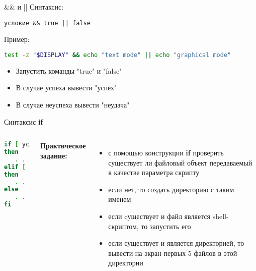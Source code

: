 \begin{frame}[fragile]{\&\& и ||}
	Синтаксис:
\begin{verbatim}
условие && true || false
\end{verbatim}

	\pause
	Пример:
\begin{lstlisting}[language=bash]
test -z "$DISPLAY" && echo "text mode" || echo "graphical mode"
\end{lstlisting}
	
	\pause

	\begin{itemize}
	    \item Запустить команды "true" и "false"
	    \item В случае успеха вывести "успех"
	    \item В случае неуспеха вывести "неудача"
	\end{itemize}
\end{frame}



\begin{frame}[fragile]{Синтаксис {\bf if}}

	\begin{columns}
	
	\begin{lstlisting}[language=bash]
if [ условие1 ]
then
   . . .
elif [ условие2 ]
then
   . . .
else
   . . .
fi
\end{lstlisting}
	{\bf Практическое задание:} \\
	\begin{itemize}

		\item с помощью конструкции {\bf if} проверить существует ли файловый объект передаваемый в качестве параметра скрипту
		\item если нет, то создать директорию с таким именем
		\item если cуществует и файл является shell-скриптом, то запустить его
		\item если существует и является директорией, то вывести на экран первых 5 файлов в этой директории
	\end{itemize}
	\end{columns}
\end{frame}




